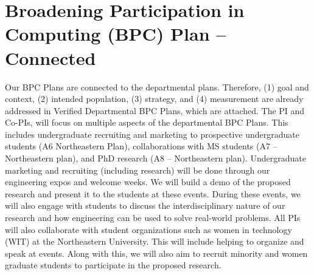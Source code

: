 
\section*{Broadening Participation in Computing (BPC) Plan – Connected}

Our BPC Plans are connected to the departmental plans. Therefore, (1) goal and
context, (2) intended population, (3) strategy, and (4) measurement are already
addressed in Verified Departmental BPC Plans, which are attached. The PI and
Co-PIs, will focus on multiple aspects of the departmental BPC Plans. This
includes undergraduate recruiting and marketing to prospective undergraduate
students (A6 Northeastern Plan), collaborations with MS students (A7 –
Northeastern plan), and PhD research (A8 – Northeastern plan). Undergraduate
marketing and recruiting (including research) will be done through our
engineering expos and welcome weeks. We will build a demo of the proposed
research and present it to the students at these events. During these events,
we will also engage with students to discuss the interdisciplinary nature of
our research and how engineering can be used to solve real-world problems.  All
PIs will also collaborate with student organizations such as women in
technology (WIT) at the Northeastern University. This will include helping to
organize and speak at events. Along with this, we will also aim to recruit
minority and women graduate students to participate in the proposed research.

